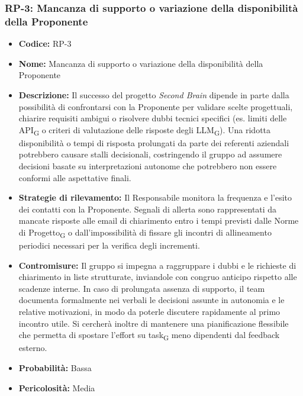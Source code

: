 \documentclass[a4paper, 10pt, colorlinks=true, linkcolor=black, urlcolor=blue, citecolor=blue, hidelinks]{article}
\begin{document}
\subsubsection{RP-3: Mancanza di supporto o variazione della disponibilità della Proponente}
\begin{itemize}
    \item \textbf{Codice:} RP-3
    \item \textbf{Nome:} Mancanza di supporto o variazione della disponibilità della Proponente

    \item \textbf{Descrizione:} Il successo del progetto \textit{Second Brain} dipende in parte dalla possibilità di confrontarsi con la Proponente per validare scelte progettuali, chiarire requisiti ambigui o risolvere dubbi tecnici specifici (es. limiti delle API\textsubscript{G} o criteri di valutazione delle risposte degli LLM\textsubscript{G}). Una ridotta disponibilità o tempi di risposta prolungati da parte dei referenti aziendali potrebbero causare stalli decisionali, costringendo il gruppo ad assumere decisioni basate su interpretazioni autonome che potrebbero non essere conformi alle aspettative finali.

    \item \textbf{Strategie di rilevamento:} Il Responsabile monitora la frequenza e l'esito dei contatti con la Proponente. Segnali di allerta sono rappresentati da mancate risposte alle email di chiarimento entro i tempi previsti dalle Norme di Progetto\textsubscript{G} o dall'impossibilità di fissare gli incontri di allineamento periodici necessari per la verifica degli incrementi.

    \item \textbf{Contromisure:} Il gruppo si impegna a raggruppare i dubbi e le richieste di chiarimento in liste strutturate, inviandole con congruo anticipo rispetto alle scadenze interne. In caso di prolungata assenza di supporto, il team documenta formalmente nei verbali le decisioni assunte in autonomia e le relative motivazioni, in modo da poterle discutere rapidamente al primo incontro utile. Si cercherà inoltre di mantenere una pianificazione flessibile che permetta di spostare l'effort su task\textsubscript{G} meno dipendenti dal feedback esterno.

    \item \textbf{Probabilità:} Bassa

    \item \textbf{Pericolosità:} Media
\end{itemize}
\end{document}
